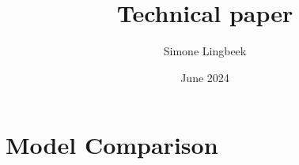 \documentclass[12pt]{article}
\title{Technical paper}
\author{Simone Lingbeek}
\date{June 2024}
\begin{document}
\maketitle

\section{Model Comparison}

\end{document}
